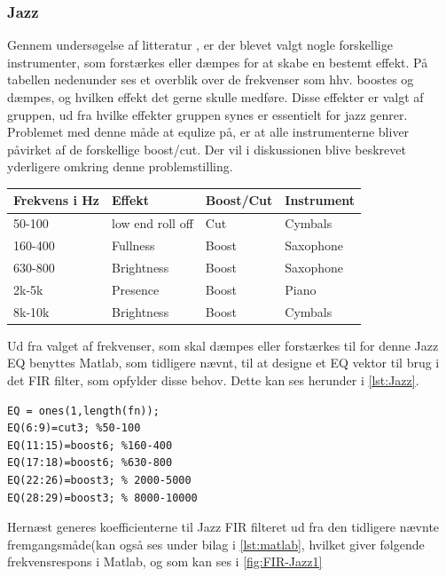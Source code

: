 \subsubsection{Jazz}
Gennem undersøgelse af litteratur \cite[chapter 12]{HomeStudio}, er der blevet valgt nogle forskellige instrumenter, som forstærkes eller dæmpes for at skabe en bestemt effekt. På tabellen nedenunder ses et overblik over de frekvenser som hhv. boostes og dæmpes, og hvilken effekt det gerne skulle medføre. Disse effekter er valgt af gruppen, ud fra hvilke effekter gruppen synes er essentielt for jazz genrer. Problemet med denne måde at equlize på, er at alle instrumenterne bliver påvirket af de forskellige boost/cut. Der vil i diskussionen blive beskrevet yderligere omkring denne problemstilling. 

\begin{center}
\begin{tabular}{| l | l | l | l |}
\hline
 Frekvens i Hz  & Effekt  & Boost/Cut & Instrument  \\\hline
 50-100 & low end roll off & Cut & Cymbals \\ \hline
 160-400 & Fullness & Boost & Saxophone\\ \hline
 630-800 & Brightness & Boost & Saxophone \\ \hline
 2k-5k & Presence & Boost & Piano\\ \hline
 8k-10k & Brightness & Boost & Cymbals\\ \hline
 
 
\end{tabular}

\end{center}



Ud fra valget af frekvenser, som skal dæmpes eller forstærkes til for denne Jazz EQ benyttes Matlab, som tidligere nævnt, til at designe et EQ vektor til brug i det FIR filter, som opfylder disse behov. Dette kan ses herunder i  \autoref{lst:Jazz}.   

\begin{lstlisting}[frame=single, caption={FIR EQ vektor Jazz kode},label={lst:Jazz},captionpos=b]
%% Jazz
EQ = ones(1,length(fn));
EQ(6:9)=cut3; %50-100 
EQ(11:15)=boost6; %160-400
EQ(17:18)=boost6; %630-800
EQ(22:26)=boost3; % 2000-5000
EQ(28:29)=boost3; % 8000-10000
\end{lstlisting} 
Hernæst generes koefficienterne til Jazz FIR filteret ud fra den tidligere nævnte fremgangsmåde(kan også ses under bilag i \autoref{lst:matlab}, hvilket giver følgende frekvensrespons i Matlab, og som kan ses i  \autoref{fig:FIR-Jazz1}

